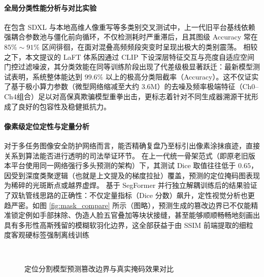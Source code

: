 \documentclass[10pt,a4paper,twocolumn]{ctexart}
\begin{document}
\paragraph{全局分类性能分析与对比实验}
在包含 SDXL 与本地高维人像重写等多类别交叉测试中，上一代旧平台基线依赖强耦合参数池与僵化前向循环，不仅检测耗时严重滞后，且其图级 Accuracy 常在 $85\% \sim 91\%$ 区间徘徊，在面对混叠高频频段突变时呈现出极大的类别震荡。
相较之下，本文提议的 LaFT 体系因通过 CLIP 下设深层特征交互与亮度自适应空间门控过滤噪波，其分类效能在同等训练阶段出现了代差级极显著跃迁：最新模型测试表明，系统整体能达到 $99.6\%$ 以上的极高分类阻截率（Accuracy）。这不仅证实了基于极小算力参数（微型网络缩减至大约 3.6M）的去噪及频率极端特征（Ch0--Ch4组合）足以对高保真欺骗模型重拳出击，更标志着针对不同生成器溯源干扰形成了良好的包容性及稳健抵抗力。

\paragraph{像素级定位定性与定量分析}
对于多任务图像安全防护网络而言，能否精确复盘乃至标引出像素涂抹痕迹，直接关系到算法能否进行透明的司法举证环节。
在上一代统一骨架范式（即原老旧版本平台使用同一网络强行多头预测的架构）下，其测试 Dice 取值往往低于 $0.65$，因受到深度类聚逻辑（也就是上文提及的梯度拉扯）覆盖，预测的定位掩码图表现为稀碎的光斑断点或越界虚焊。
基于 SegFormer 并行独立解耦训练后的结果验证了双轨管线思路的正确性：不仅定量指标（Dice 分数）飙升，定性视觉分析也更趋严密。如图 \ref{fig:mask_compare} 所示（图略），预测生成的篡改边界已不仅能精准锁定例如手部抹除、伪造人脸五官叠加等块状接缝，甚至能够顺顺畅畅地刻画出具有多形性高斯残留的模糊软羽化边界，这全部获益于由 SSIM 前端提取的细粒度客观硬标签强制离线训练\1

\begin{figure}[htbp]
    \centering
    \vspace{1em}
    \vspace{1em}
    \caption{定位分割模型预测篡改边界与真实掩码效果对比}
    \ 
\end{figure}
\end{document}
